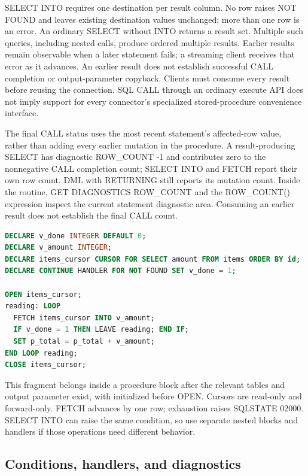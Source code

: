 SELECT INTO requires one destination per result column. No row raises NOT FOUND
and leaves existing destination values unchanged; more than one row is an
error. An ordinary SELECT without INTO returns a result set. Multiple such
queries, including nested calls, produce ordered multiple results. Earlier
results remain observable when a later statement fails; a streaming client
receives that error as it advances. An earlier result does not establish
successful CALL completion or output-parameter copyback. Clients
must consume every result before reusing the connection. SQL CALL through an
ordinary execute API does not imply support for every connector's specialized
stored-procedure convenience interface.

The final CALL status uses the most recent statement's affected-row value,
rather than adding every earlier mutation in the procedure. A result-producing
SELECT has diagnostic ROW\_COUNT -1 and contributes zero to the nonnegative
CALL completion count; SELECT INTO and FETCH report their own row count.
DML with RETURNING still reports its mutation count. Inside the routine,
GET DIAGNOSTICS ROW\_COUNT and the ROW\_COUNT() expression inspect the current
statement diagnostic area. Consuming an earlier result does not establish the
final CALL count.

\begin{lstlisting}[language=SQL]
DECLARE v_done INTEGER DEFAULT 0;
DECLARE v_amount INTEGER;
DECLARE items_cursor CURSOR FOR SELECT amount FROM items ORDER BY id;
DECLARE CONTINUE HANDLER FOR NOT FOUND SET v_done = 1;

OPEN items_cursor;
reading: LOOP
  FETCH items_cursor INTO v_amount;
  IF v_done = 1 THEN LEAVE reading; END IF;
  SET p_total = p_total + v_amount;
END LOOP reading;
CLOSE items_cursor;
\end{lstlisting}

This fragment belongs inside a procedure block after the relevant tables and
output parameter exist, with  initialized before OPEN. Cursors
are read-only and forward-only. FETCH advances by one row; exhaustion raises
SQLSTATE 02000. SELECT INTO can raise the same condition, so use separate
nested blocks and handlers if those operations need different behavior.

\subsection{Conditions, handlers, and diagnostics}

